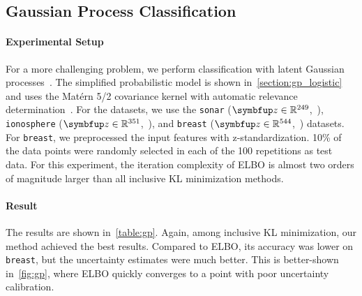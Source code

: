   \vspace{-0.05in}
\subsection{Gaussian Process Classification}\label{section:bgp}
  \vspace{-0.05in}
\paragraph{Experimental Setup}
For a more challenging problem, we perform classification with latent Gaussian processes~\citep{NIPS2014_8c6744c9}.
The simplified probabilistic model is shown in~\cref{section:gp_logistic} and uses the Mat\'ern 5/2 covariance kernel with automatic relevance determination~\citep{neal_bayesian_1996}.
For the datasets, we use the \texttt{sonar} (\(\vz \in \mathbb{R}^{249}\),~\citealt{gorman_analysis_1988}), \texttt{ionosphere} (\(\vz \in \mathbb{R}^{351}\),~\citealt{Sigillito1989ClassificationOR}), and \texttt{breast} (\(\vz \in \mathbb{R}^{544}\),~\citealt{wolberg_multisurface_1990}) datasets.
For \texttt{breast}, we preprocessed the input features with z-standardization.
10\% of the data points were randomly selected in each of the 100 repetitions as test data.
For this experiment, the iteration complexity of ELBO is almost two orders of magnitude larger than all inclusive KL minimization methods.

%
%
\vspace{-0.05in}
\paragraph{Result}
The results are shown in~\cref{table:gp}.
Again, among inclusive KL minimization, our method achieved the best results.
Compared to ELBO, its accuracy was lower on \texttt{breast}, but the uncertainty estimates were much better.
This is better-shown in~\cref{fig:gp}, where ELBO quickly converges to a point with poor uncertainty calibration.

